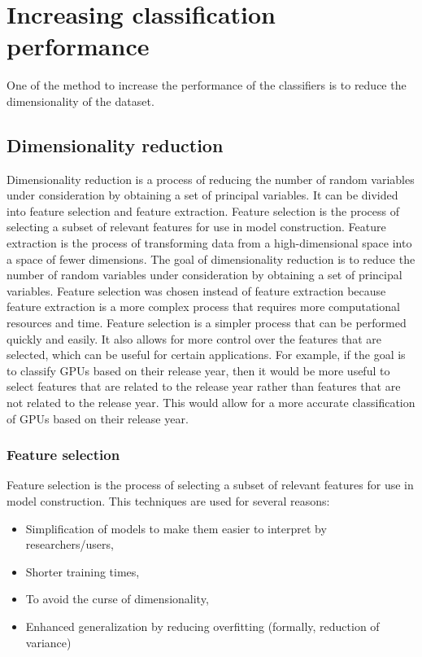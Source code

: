 \documentclass[conference,onecolumn]{IEEEtran}
\begin{document}
\section{Increasing classification performance}
    One of the method to increase the performance of the classifiers is to reduce the dimensionality of the dataset.
    \subsection{Dimensionality reduction}
        Dimensionality reduction is a process of reducing the number of random variables under consideration by obtaining a set of principal variables. It can be divided into feature selection and feature extraction. Feature selection is the process of selecting a subset of relevant features for use in model construction. Feature extraction is the process of transforming data from a high-dimensional space into a space of fewer dimensions. The goal of dimensionality reduction is to reduce the number of random variables under consideration by obtaining a set of principal variables.
        Feature selection was chosen instead of feature extraction because feature extraction is a more complex process that requires more computational resources and time. Feature selection is a simpler process that can be performed quickly and easily. It also allows for more control over the features that are selected, which can be useful for certain applications. For example, if the goal is to classify GPUs based on their release year, then it would be more useful to select features that are related to the release year rather than features that are not related to the release year. This would allow for a more accurate classification of GPUs based on their release year.

    \subsubsection{Feature selection}
        Feature selection is the process of selecting a subset of relevant features for use in model construction. This techniques are used for several reasons:
        \begin{itemize}
            \item Simplification of models to make them easier to interpret by researchers/users,
            \item Shorter training times,
            \item To avoid the curse of dimensionality,
            \item Enhanced generalization by reducing overfitting (formally, reduction of variance)
        \end{itemize}
\end{document}
